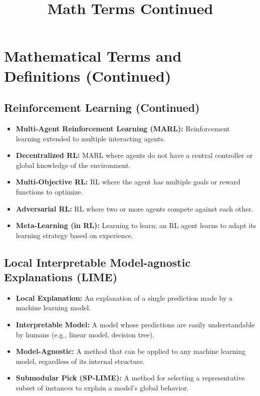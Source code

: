 \documentclass{article}
\title{Math Terms Continued}
\date{}
\begin{document}
\maketitle

\section{Mathematical Terms and Definitions (Continued)}

\subsection{Reinforcement Learning (Continued)}

\begin{itemize}
    \item \textbf{Multi-Agent Reinforcement Learning (MARL): } Reinforcement learning extended to multiple interacting agents.
    \item \textbf{Decentralized RL: } MARL where agents do not have a central controller or global knowledge of the environment.
    \item \textbf{Multi-Objective RL: } RL where the agent has multiple goals or reward functions to optimize.
    \item \textbf{Adversarial RL: } RL where two or more agents compete against each other.
    \item \textbf{Meta-Learning (in RL): }  Learning to learn;  an RL agent learns to adapt its learning strategy based on experience.
\end{itemize}


\subsection{Local Interpretable Model-agnostic Explanations (LIME)}

\begin{itemize}
    \item \textbf{Local Explanation:}  An explanation of a single prediction made by a machine learning model.
    \item \textbf{Interpretable Model:}  A model whose predictions are easily understandable by humans (e.g., linear model, decision tree).
    \item \textbf{Model-Agnostic:} A method that can be applied to any machine learning model, regardless of its internal structure.
    \item \textbf{Submodular Pick (SP-LIME): } A method for selecting a representative subset of instances to explain a model's global behavior.
\end{itemize}
\end{document}

